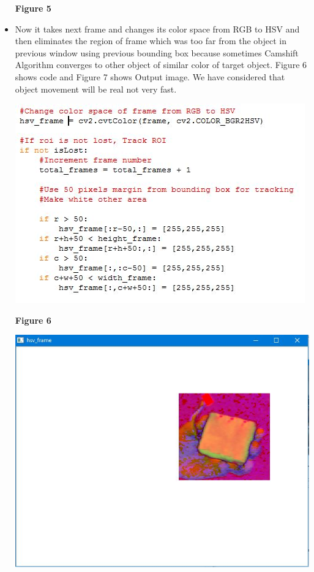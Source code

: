 \documentclass[11pt,a4paper]{article}
\begin{document}
\begin{itemize}
\begin{center}
				\end{center}
				\begin{center}
					\textbf{Figure 5}
				\end{center}
		 	\item Now it takes next frame and changes its color space from RGB to HSV and then eliminates the region of frame which was too far from the object in previous window using previous bounding box because sometimes Camshift Algorithm converges to other object of similar color of target object. Figure 6 shows code and Figure 7 shows Output image. We have considered that object movement will be real not very fast.
			 	\begin{center}
			 		\includegraphics[scale=0.9]{frame_elimination_code.JPG}
			 	\end{center}
			 	\begin{center}
			 		\textbf{Figure 6}
			 	\end{center}
			 	\begin{center}
			 		\includegraphics[scale=0.8]{eliminated_hsv_frame.JPG}

\end{center}
\end{itemize}
\end{document}
